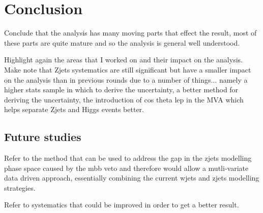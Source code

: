 \chapter{Conclusion}%
\label{ch:conclusion}
Conclude that the analysis has many moving parts that effect the result, most of
these parts are quite mature and so the analysis is general well understood.

Highlight again the areas that I worked on and their impact on the analysis.
Make note that Zjets systematics are still significant but have a smaller impact
on the analysis than in previous rounds due to a number of things... namely a
higher stats sample in which to derive the uncertainty, a better method for
deriving the uncertainty, the introduction of cos theta lep in the MVA which
helps separate Zjets and Higgs events better.

\section{Future studies}%
\label{sec:future}

Refer to the method that can be used to address the gap in the zjets modelling
phase space caused by the mbb veto and therefore would allow a mutli-variate
data driven approach, essentially combining the current wjets and zjets
modelling strategies.

Refer to systematics that could be improved in order to get a better result.